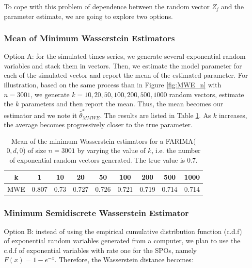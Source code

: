 \documentclass[
  11pt,
]{article}
\begin{document}
To cope with this problem of dependence between the random vector
\(Z_j\) and the parameter estimate, we are going to explore two options.

\hypertarget{mean-of-minimum-wasserstein-estimators}{%
\subsubsection{Mean of Minimum Wasserstein
Estimators}\label{mean-of-minimum-wasserstein-estimators}}

Option A: for the simulated times series, we generate several
exponential random variables and stack them in vectors. Then, we
estimate the model parameter for each of the simulated vector and report
the mean of the estimated parameter. For illustration, based on the same
process than in Figure \ref{fig:MWE_n} with \(n = 3001\), we generate
\(k = 10, 20 , 50, 100 , 200, 500, 1000\) random vectors, estimate the
\(k\) parameters and then report the mean. Thus, the mean becomes our
estimator and we note it \(\hat \theta^*_{MMWE}\). The results are
listed in Table \ref{tab:MWE_k}. As \(k\) increases, the average becomes
progressively closer to the true parameter.

\begin{table}[h]
\centering
\begin{tabular}{|c|c|c|c|c|c|c|c|c|}
\hline
k &  1 & 10   & 20    & 50    & 100   & 200   & 500   & 1000 \\
\hline
MWE & 0.807 & 0.73 & 0.727 & 0.726 & 0.721 & 0.719 & 0.714 & 0.714 \\
\hline
\end{tabular}
\caption{Mean of the minimum Wasserstein estimators for a FARIMA($0,d,0$) of size $n = 3001$ by varying the value of $k$, i.e. the number of exponential random vectors generated. The true value is 0.7.}
\label{tab:MWE_k}
\end{table}

\hypertarget{minimum-semidiscrete-wasserstein-estimator}{%
\subsubsection{Minimum Semidiscrete Wasserstein
Estimator}\label{minimum-semidiscrete-wasserstein-estimator}}

Option B: instead of using the empirical cumulative distribution
function (c.d.f) of exponential random variables generated from a
computer, we plan to use the c.d.f of exponential variables with rate
one for the SPOs, namely \(F(x)=1-e^{-x}\). Therefore, the Wasserstein
distance becomes:
\end{document}
